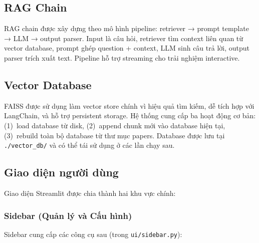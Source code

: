 \documentclass[10pt, conference, a4paper, compsocconf]{IEEEtran}
\begin{document}
\subsection{RAG Chain}
RAG chain được xây dựng theo mô hình pipeline: retriever → prompt template → LLM → output parser. Input là câu hỏi, retriever tìm context liên quan từ vector database, prompt ghép question + context, LLM sinh câu trả lời, output parser trích xuất text. Pipeline hỗ trợ streaming cho trải nghiệm interactive.

\subsection{Vector Database}
FAISS được sử dụng làm vector store chính vì hiệu quả tìm kiếm, dễ tích hợp với LangChain, và hỗ trợ persistent storage. Hệ thống cung cấp ba hoạt động cơ bản: (1)~load database từ disk, (2)~append chunk mới vào database hiện tại, (3)~rebuild toàn bộ database từ thư mục papers. Database được lưu tại \verb|./vector_db/| và có thể tái sử dụng ở các lần chạy sau.

\subsection{Giao diện người dùng}
Giao diện Streamlit được chia thành hai khu vực chính:

\subsubsection{Sidebar (Quản lý và Cấu hình)}
Sidebar cung cấp các công cụ sau (trong \texttt{ui/sidebar.py}):
\end{document}
